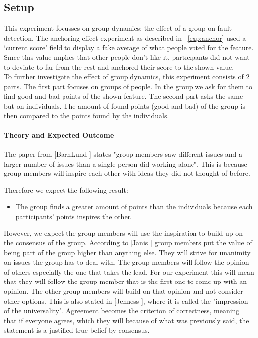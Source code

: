 \documentclass[main.tex]{subfiles}
\begin{document}
\subsection{Setup}
This experiment focusses on group dynamics; the effect of a group on fault detection. The anchoring effect experiment as described in ~\ref{exp:anchor} used a `current score' field to display a fake average of what people voted for the feature. Since this value implies that other people don't like it, participants did not want to deviate to far from the rest and anchored their score to the shown value. \\
To further investigate the effect of group dynamics, this experiment consists of 2 parts. The first part focuses on groups of people. In the group we ask for them to find good and bad points of the shown feature. The second part asks the same but on individuals. The amount of found points (good and bad) of the group is then compared to the points found by the individuals.

\paragraph{Theory and Expected Outcome}
The paper from [BarnLund \cite{barnlund}] states "group members saw different issues and a larger number of issues than a single person did working alone". This is because group members will inspire each other with ideas they did not thought of before. 

Therefore we expect the following result:
\begin{itemize}
\item The group finds a greater amount of points than the individuals because each participants' points inspires the other. 
\end{itemize}

However, we expect the group members will use the inspiration to build up on the consensus of the group.
According to [Janis \cite{janis}] group members put the value of being part of the group higher than anything else. They will strive for unanimity on issues the group has to deal with. The group members will follow the opinion of others especially the one that takes the lead. For our experiment this will mean that they will follow the group member that is the first one to come up with an opinion. The other group members will build on that opinion and not consider other options. This is also stated in [Jenness \cite{jenness}], where it is called the "impression of the universality". Agreement becomes the criterion of correctness, meaning that if everyone agrees, which they will because of what was previously said, the statement is a justified true belief by consensus.
\end{document}
